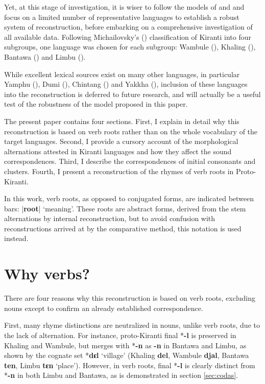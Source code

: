 \documentclass[oldfontcommands,oneside,a4paper,11pt]{article}
\newcommand{\ipa}[1]{\textbf{{\phon\mbox{#1}}}} %
\newcommand{\dhatu}[2]{|\ipa{#1}| `#2'}
\begin{document}
Yet, at this stage of investigation, it is wiser to follow the models of \citet{bloomfield25central} and \citet{dempwolff34induktiver} and focus on a limited number of representative languages to establish a robust system of reconstruction, before embarking on a comprehensive investigation of all available data. Following Michailovsky's (\citeyear{michailovsky94stops}) classification of Kiranti into four subgroups, one language was chosen for each subgroup: Wambule (\citealt{opgenort04wambule}), Khaling (\citealt{jacques12khaling, jacques15khaling}), Bantawa (\citealt{doornenbal09}) and Limbu (\citealt{driem87, michailovsky02dico}). 

While excellent lexical sources exist on many other languages, in particular  Yamphu (\citealt{rutgers98yamphu}), Dumi  (\citealt{driem93dumi, rai11dumi}), Chintang  (\citealt{rai11chintang}) and  Yakkha  (\citealt{kongren07yakkha}), inclusion of these languages into the reconstruction is deferred to future research, and will actually be a useful test of the robustness of the model proposed in this paper.

The present paper contains four sections. First, I explain in detail why this reconstruction is based on verb roots rather than on the whole vocabulary of the target languages. Second, I provide a cursory account of the morphological alternations attested in Kiranti languages and how they affect the sound correspondences. Third, I describe the correspondences of initial consonants and clusters. Fourth, I present a reconstruction of the rhymes of verb roots in Proto-Kiranti.

In this work, verb roots, as opposed to conjugated forms, are indicated between bars: \dhatu{root}{meaning}. These roots are abstract forms, derived from the stem alternations by internal reconstruction, but to avoid confusion with reconstructions arrived at by the comparative method, this notation is used instead. 

\section{Why verbs?} \label{sec:why}

There are four reasons why this reconstruction is based on verb roots, excluding nouns except to confirm an already established correspondence.

First,  many rhyme distinctions are neutralized in nouns, unlike verb roots, due to the lack of alternation. For instance, proto-Kiranti final *\ipa{-l} is preserved in Khaling and Wambule, but merges with *\ipa{-n} as \ipa{-n} in Bantawa and Limbu, as shown by the cognate set *\ipa{dɛl} `village' (Khaling \ipa{del}, Wambule \ipa{djal}, Bantawa \ipa{ten}, Limbu \ipa{tɛn} `place'). However, in verb roots, final *\ipa{-l} is clearly distinct from *\ipa{-n} in both Limbu and Bantawa, as is demonstrated in section \ref{sec:codas}.
\end{document}
